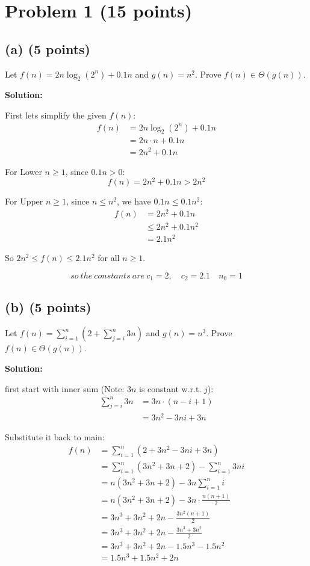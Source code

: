 \documentclass[11pt]{article}
\begin{document}
\section*{Problem 1 (15 points)}

\subsection*{(a) (5 points)}
Let $f(n)=2n \log_{2}(2^{n})+0.1n$ and $g(n)=n^{2}$. Prove $f(n)\in\Theta(g(n))$.

\textbf{Solution:}

First lets simplify the given $f(n)$:
\begin{align*}
f(n) &= 2n \log_2(2^n) + 0.1n \\
&= 2n \cdot n + 0.1n \\
&= 2n^2 + 0.1n
\end{align*}

For Lower $n \ge 1$, since $0.1n > 0$:
\[ f(n) = 2n^2 + 0.1n > 2n^2 \]

For Upper $n \ge 1$, since $n \le n^2$, we have $0.1n \le 0.1n^2$:
\begin{align*}
f(n) &= 2n^2 + 0.1n \\
&\le 2n^2 + 0.1n^2 \\
&= 2.1n^2
\end{align*}

So $2n^2 \le f(n) \le 2.1n^2$ for all $n \ge 1$.

\[ so \ the \ constants \ are \ \boxed{c_1 = 2, \quad c_2 = 2.1 \quad n_ 0 = 1} \]

\subsection*{(b) (5 points)}
Let $f(n)=\sum_{i=1}^{n}(2+\sum_{j=i}^{n}3n)$ and $g(n)=n^{3}$. Prove $f(n)\in\Theta(g(n))$.

\textbf{Solution:}

first start with inner sum (Note: $3n$ is constant w.r.t. $j$):
\begin{align*}
\sum_{j=i}^{n} 3n &= 3n \cdot (n - i + 1) \\
&= 3n^2 - 3ni + 3n
\end{align*}

Substitute it back to main:
\begin{align*}
f(n) &= \sum_{i=1}^{n} \left(2 + 3n^2 - 3ni + 3n\right) \\
&= \sum_{i=1}^{n} (3n^2 + 3n + 2) - \sum_{i=1}^{n} 3ni \\
&= n(3n^2 + 3n + 2) - 3n \sum_{i=1}^{n} i \\
&= n(3n^2 + 3n + 2) - 3n \cdot \frac{n(n+1)}{2} \\
&= 3n^3 + 3n^2 + 2n - \frac{3n^2(n+1)}{2} \\
&= 3n^3 + 3n^2 + 2n - \frac{3n^3 + 3n^2}{2} \\
&= 3n^3 + 3n^2 + 2n - 1.5n^3 - 1.5n^2 \\
&= 1.5n^3 + 1.5n^2 + 2n
\end{align*}
\end{document}
